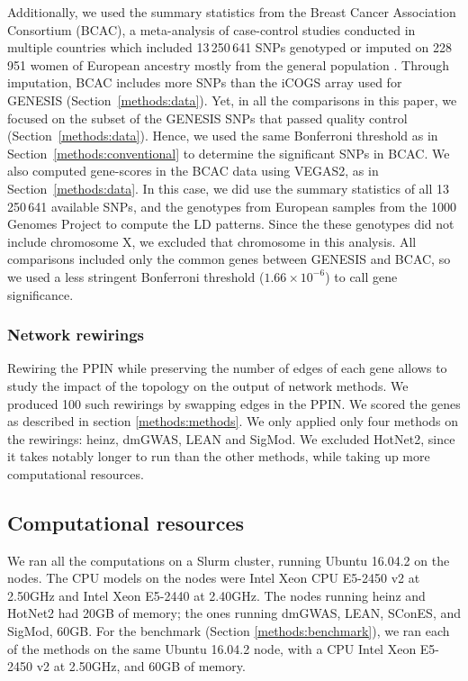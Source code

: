 \documentclass[10pt,letterpaper]{article}
\begin{document}
Additionally, we used the summary statistics from the Breast Cancer Association Consortium (BCAC), a meta-analysis of case-control studies conducted in multiple countries which included 13\,250\,641 SNPs genotyped or imputed on 228\,951 women of European ancestry mostly from the general population \cite{Michailidou2017}. Through imputation, BCAC includes more SNPs than the iCOGS array used for GENESIS (Section~\ref{methods:data}). Yet, in all the comparisons in this paper, we focused on the subset of the GENESIS SNPs that passed quality control (Section~\ref{methods:data}). Hence, we used the same Bonferroni threshold as in Section~\ref{methods:conventional} to determine the significant SNPs in BCAC. We also computed gene-scores in the BCAC data using VEGAS2, as in Section~\ref{methods:data}. In this case, we did use the summary statistics of all 13\,250\,641 available SNPs, and the genotypes from European samples from the 1000 Genomes Project \cite{the_1000_genomes_project_consortium_global_2015} to compute the LD patterns. Since the these genotypes did not include chromosome X, we excluded that chromosome in this analysis. All comparisons included only the common genes between GENESIS and BCAC, so we used a less  stringent Bonferroni threshold ($1.66 \times 10^{-6}$) to call gene significance. 

\subsubsection{Network rewirings}
\label{methods:rewiring}

Rewiring the PPIN while preserving the number of edges of each gene allows to study the impact of the topology on the output of network methods. We produced 100 such rewirings by swapping edges in the PPIN. We scored the genes as described in section \ref{methods:methods}. We only applied only four methods on the rewirings: heinz, dmGWAS, LEAN and SigMod. We excluded HotNet2, since it takes notably longer to run than the other methods, while taking up more computational resources. 

\subsection{Computational resources}
\label{methods:computation}

We ran all the computations on a Slurm cluster, running Ubuntu 16.04.2 on the nodes. The CPU models on the nodes were Intel Xeon CPU E5-2450 v2 at 2.50GHz and Intel Xeon E5-2440 at 2.40GHz. The nodes running heinz and HotNet2 had 20GB of memory; the ones running dmGWAS, LEAN, SConES, and SigMod, 60GB. For the benchmark (Section \ref{methods:benchmark}), we ran each of the methods on the same Ubuntu 16.04.2 node, with a CPU Intel Xeon E5-2450 v2 at 2.50GHz, and 60GB of memory.
\end{document}
